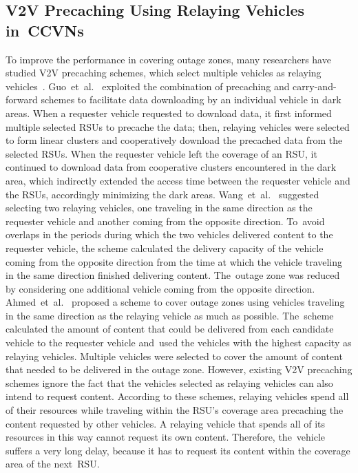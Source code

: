 \documentclass[sensors,aricle,accept,pdftex,moreauthors]{Definitions/mdpi}
\begin{document}
\subsection{V2V Precaching Using Relaying Vehicles in~CCVNs}
To improve the performance in covering outage zones, many researchers have studied V2V precaching schemes, which select multiple vehicles as relaying vehicles~\cite{Wang2017, Ahmed2018, Guo2017}.
Guo~et~al.~\cite{Guo2017} exploited the combination of precaching and carry-and-forward schemes to facilitate data downloading by an individual vehicle in dark areas. When a requester vehicle requested to download data, it first informed multiple selected RSUs to precache the data; then, relaying vehicles 
were selected to form linear clusters and cooperatively download the precached data from the selected RSUs. When the requester vehicle left the coverage of an RSU, it continued to download data from cooperative clusters encountered in the dark area, which indirectly extended the access time between the requester vehicle and the RSUs, accordingly minimizing the dark areas.
Wang~et~al.~\cite{Wang2017} suggested selecting two relaying vehicles, one traveling in the same direction as the requester vehicle and another coming from the opposite direction. To~avoid overlaps in the periods during which the two vehicles delivered content to the requester vehicle, the scheme calculated the delivery capacity of the vehicle coming from the opposite direction from the time at which the vehicle traveling in the same direction finished delivering content. The~outage zone was reduced by considering one additional vehicle coming from the opposite direction.
Ahmed~et~al.~\cite{Ahmed2018} proposed a scheme to cover outage zones using vehicles traveling in the same direction as the relaying vehicle as much as possible. The~scheme calculated the amount of content that could be delivered from each candidate vehicle to the requester vehicle and~used the vehicles with the highest capacity as relaying vehicles. Multiple vehicles were selected to cover the amount of content that needed to be delivered in the outage zone.
However, existing V2V precaching schemes ignore the fact that the vehicles selected as relaying vehicles can also intend to request content.
According to these schemes, relaying vehicles spend all of their resources while traveling within the RSU's coverage area precaching the content requested by other vehicles.
A relaying vehicle that spends all of its resources in this way cannot request its own content.
Therefore, the~vehicle suffers a very long delay, because it has to request its content within the coverage area of the next~RSU.
\end{document}
